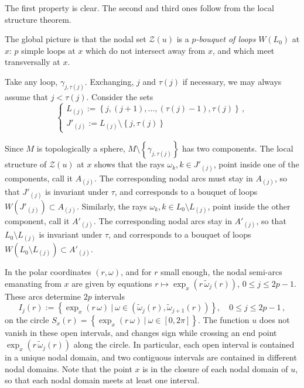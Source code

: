 \documentclass[12pt,a4paper]{amsart}
\theoremstyle{plain} %
\theoremstyle{definition}
\numberwithin{equation}{section}
\numberwithin{figure}{section}
\numberwithin{table}{section}
\newcommand{\cZ}{\mathcal{Z}}
\newcommand{\sm}{\!\setminus\!}
\newcommand{\set}[1]{\left\lbrace #1 \right\rbrace}
\newcommand{\omegat}{\widetilde{\omega}}
\begin{document}
The first property is clear. The second and third ones follow from the local structure theorem. \smallskip

The global picture is that the nodal set $\cZ(u)$ is a \emph{$p$-bouquet of loops} $W(L_0)$ at $x$: $p$ simple loops at $x$ which do not intersect away from $x$, and which meet transversally at $x$.\smallskip

Take any loop, $\gamma_{j,\tau(j)}$. Exchanging, $j$ and $\tau(j)$ if necessary, we may always assume that $j < \tau(j)$. Consider the sets
%
\begin{equation}\label{E-llnd-6}
\left\{
\begin{array}{l}
L_{(j)} := \set{j,(j+1),\ldots,(\tau(j)-1),\tau(j)}\,,\\[5pt]
J'_{(j)} := L_{(j)} \sm \set{j,\tau(j)}
\end{array}
\right.
\end{equation}

Since $M$ is topologically a sphere, $M\sm \set{\gamma_{j,\tau(j)}}$ has two components. The local structure of $\cZ(u)$ at $x$ shows that the rays $\omega_k, k \in J'_{(j)}$, point inside one of the components, call it $A_{(j)}$.
The corresponding nodal arcs must stay in $A_{(j)}$, so that  $J'_{(j)}$ is invariant under $\tau$, and corresponds to a bouquet of loops $W(J'_{(j)}) \subset A_{(j)}$. Similarly, the rays $\omega_k, k \in L_0\sm L_{(j)}$, point inside the other component, call it $A'_{(j)}$. The corresponding nodal arcs stay in $A'_{(j)}$, so that $L_0\sm L_{(j)}$ is invariant under $\tau$, and corresponds to a bouquet of loops $W(L_0\sm L_{(j)}) \subset A'_{(j)}$.\medskip

In the polar coordinates $(r,\omega)$, and for $r$ small enough, the nodal semi-arcs  emanating from $x$ are given by equations $r \mapsto \exp_x(r\, \omegat_j(r))$, $0 \le j \le 2p-1$. These arcs determine $2p$ intervals
%
\begin{equation}\label{E-llnd-8}
I_j(r) := \set{ \exp_x(r \,\omega) ~|~  \omega \in \left( \omegat_j(r),\omegat_{j+1}(r) \right) }, \quad 0 \le j \le 2p-1\,,
\end{equation}
%
on the circle $S_x(r) = \set{\exp_x(r\, \omega) ~|~ \omega \in [0,2\pi]}$. The function $u$ does not vanish in these open intervals, and changes sign while crossing an end point $\exp_x(r\, \omegat_j(r))$ along the circle. In particular, each open interval is contained in a unique nodal domain, and two contiguous intervals are contained in different nodal domains. Note that the point $x$ is in the closure of each nodal domain of $u$, so that each nodal domain meets at least one interval.
\end{document}
